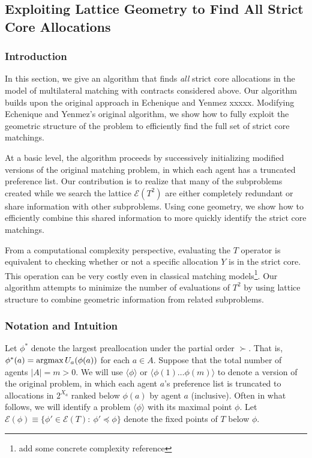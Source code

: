 \documentclass[11pt,reqno]{amsart}
\theoremstyle{definition}
\numberwithin{equation}{section}
\newcommand{\argmax}{\operatornamewithlimits{argmax}}
\newcommand{\lag}{\langle}
\newcommand{\rag}{\rangle}
\newcommand{\pre}{\phi}
\newcommand{\fix}{\mathcal{E}}
\newcommand{\peq}{\preceq}
\newcommand{\su}{\succ}
\begin{document}
\subsection{Exploiting Lattice Geometry to Find All Strict Core Allocations}
\subsubsection{Introduction}
In this section, we give an algorithm that finds \emph{all} strict core allocations in the model of multilateral matching with contracts considered above.
Our algorithm builds upon the original approach in Echenique and Yenmez xxxxx.
Modifying Echenique and Yenmez's original algorithm, we show how to fully exploit the geometric structure of the problem to efficiently find the full set of strict core matchings. 

At a basic level, the algorithm proceeds by successively initializing modified versions of the original matching problem, in which each agent has a truncated preference list.
Our contribution is to realize that many of the subproblems created while we search the lattice $\fix(T^2)$  are either completely redundant or share information with other subproblems.
Using cone geometry, we show how to efficiently combine this shared information to more quickly identify the strict core matchings. 

From a computational complexity perspective, evaluating the $T$ operator is equivalent to checking whether or not a specific allocation $Y$ is in the strict core.
This operation can be very costly even in classical matching models\footnote{add some concrete complexity reference}.
Our algorithm attempts to minimize the number of evaluations of $T^2$ by using lattice structure to combine geometric information from related subproblems. 

\subsubsection{Notation and Intuition} 
Let $\pre^*$ denote the largest preallocation under the partial order $\su$.
That is, $\pre^*(a) = \argmax U_a(\pre(a))$ for each $a \in A$.
Suppose that the total number of agents $|A| = m > 0$.
We will use $\langle \pre \rangle$ or $\langle \pre(1) \hdots \pre(m) \rangle$  to denote a version of the original problem, in which each agent $a$'s preference list is truncated to allocations in $2^{X_a}$ ranked below $\pre(a)$ by agent $a$ (inclusive). 
Often in what follows, we will identify a problem $\lag \pre \rag$ with its maximal point $\pre$.
Let $\fix(\pre) \equiv \{\pre' \in \fix(T): \: \pre' \peq \pre\}$ denote the fixed points of $T$ below $\pre$.  
\end{document}
